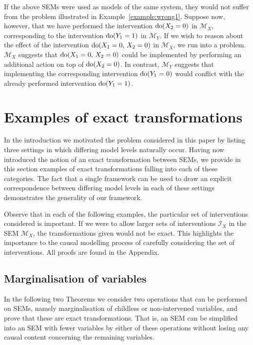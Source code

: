 If the above SEMs were used as models of the same system, they would not suffer from the problem illustrated in Example~\ref{example:wrong1}.
Suppose now, however, that we have performed the intervention $\operatorname{do}(X_2=0)$ in $\mathcal{M}_X$, corresponding to the intervention $\operatorname{do}(Y_1=1)$ in $\mathcal{M}_Y$.
If we wish to reason about the effect of the intervention $\operatorname{do}(X_1=0,\, X_2=0)$ in $\mathcal{M}_X$, we run into a problem.
$\mathcal{M}_X$ suggests that $\operatorname{do}(X_1=0,\, X_2=0)$ could be implemented by performing an additional action on top of $\operatorname{do}(X_2=0)$.
In contrast, $\mathcal{M}_Y$ suggests that implementing the corresponding intervention $\operatorname{do}(Y_1=0)$ would conflict with the already performed intervention $\operatorname{do}(Y_1=1)$.
%

\section{Examples of exact transformations}\label{sec:example-transformations}

In the introduction we motivated the problem considered in this paper by listing three settings in which differing model levels naturally occur.
Having now introduced the notion of an exact transformation between SEMs, we provide in this section examples of exact transformations falling into each of these categories.
The fact that a single framework can be used to draw an explicit correspondence between differing model levels in each of these settings demonstrates the generality of our framework.

Observe that in each of the following examples, the particular set of interventions considered is important. If we were to allow larger sets of interventions $\mathcal{I}_X$ in the SEM $\mathcal{M}_X$, the transformations given would not be exact. This highlights the importance to the causal modelling process of carefully considering the set of interventions. All proofs are found in  the Appendix.






\subsection{Marginalisation of variables}\label{sec:basic_trafos}

In the following two Theorems we consider two operations that can be performed on SEMs, namely marginalisation of childless or non-intervened variables, and prove that these are exact transformations.
That is, an SEM can be simplified into an SEM with fewer variables by either of these operations without losing any causal content concerning the remaining variables.

